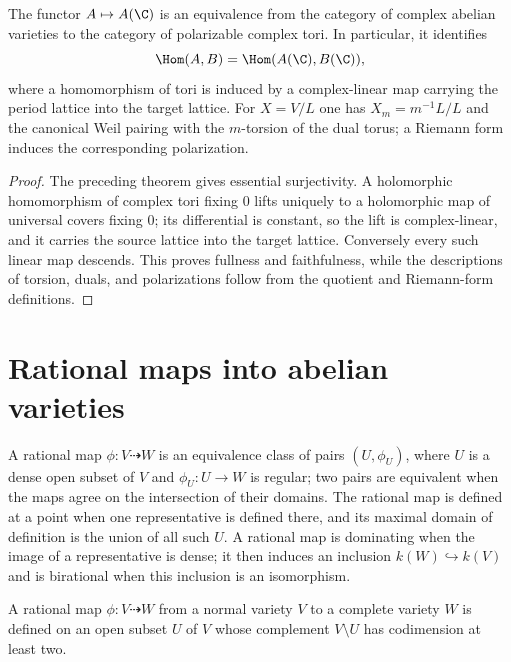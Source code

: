 \begin{theorem}
\label{thm:milne-complex-category-equivalence}

The functor $A\mapsto A(\C)$ is an equivalence from the category of complex
abelian varieties to the category of polarizable complex tori.  In particular,
it identifies
\[
 \Hom(A,B)=\Hom(A(\C),B(\C)),
\]
where a homomorphism of tori is induced by a complex-linear map carrying the
period lattice into the target lattice.  For $X=V/L$ one has
$X_m=m^{-1}L/L$ and the canonical Weil pairing with the $m$-torsion of the
dual torus; a Riemann form induces the corresponding polarization.
\end{theorem}

\begin{proof}
The preceding theorem gives essential surjectivity.  A holomorphic homomorphism
of complex tori fixing $0$ lifts uniquely to a holomorphic map of universal
covers fixing $0$; its differential is constant, so the lift is complex-linear,
and it carries the source lattice into the target lattice.  Conversely every
such linear map descends.  This proves fullness and faithfulness, while the
descriptions of torsion, duals, and polarizations follow from the quotient and
Riemann-form definitions.
\end{proof}

\section{Rational maps into abelian varieties}

\begin{definition}
\label{def:milne-rational-map}

A rational map $\phi:V\dashrightarrow W$ is an equivalence class of pairs
$(U,\phi_U)$, where $U$ is a dense open subset of $V$ and
$\phi_U:U\to W$ is regular; two pairs are equivalent when the maps agree on
the intersection of their domains.  The rational map is defined at a point
when one representative is defined there, and its maximal domain of definition
is the union of all such $U$.  A rational map is dominating when the image of
a representative is dense; it then induces an inclusion
$k(W)\hookrightarrow k(V)$ and is birational when this inclusion is an
isomorphism.
\end{definition}

\begin{theorem}
\label{thm:milne-rational-extension-complete}

A rational map $\phi:V\dashrightarrow W$ from a normal variety $V$ to a
complete variety $W$ is defined on an open subset $U$ of $V$ whose complement
$V\setminus U$ has codimension at least two.
\end{theorem}

